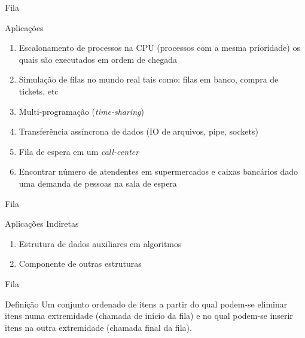   
\begin{frame}{Fila}
     \begin{block}{Aplicações}

\begin{enumerate}
  \item Escalonamento de processos na CPU (processos com a mesma prioridade)
        os quais são executados em ordem de chegada
  \item Simulação de filas no mundo real tais como: filas em banco, compra de tickets, etc
  
  \item Multi-programação (\textit{time-sharing})
  \item Transferência assíncrona de dados (IO de arquivos, pipe, sockets)
  \item Fila de espera em um \textit{call-center}      
  \item Encontrar número de atendentes em supermercados e caixas bancários dado uma
  demanda de pessoas na sala de espera
  
\end{enumerate}
     \end{block}          
\end{frame}


  
\begin{frame}{Fila}
     \begin{block}{Aplicações Indiretas}

\begin{enumerate}
  \item Estrutura de dados auxiliares em algoritmos
  \item Componente de outras estruturas
\end{enumerate}
     \end{block}          
\end{frame}

  
\begin{frame}{Fila}
     \begin{block}{Definição}
       Um conjunto ordenado de itens a partir do qual podem-se eliminar 
       itens numa extremidade (chamada de \alert{início} da fila) e
        no qual podem-se inserir itens na outra extremidade 
        (chamada \alert{final} da fila).
     \end{block}          
\end{frame}

